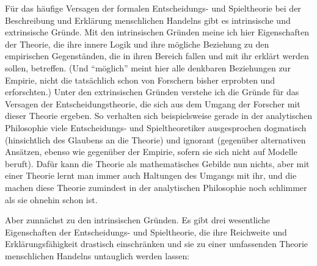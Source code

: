 Für das häufige Versagen der formalen Entscheidungs- und Spieltheorie bei der
Beschreibung und Erklärung menschlichen Handelns gibt es intrinsische und
extrinsische Gründe. Mit den intrinsischen Gründen meine ich hier Eigenschaften
der Theorie, die ihre innere Logik und ihre mögliche Beziehung zu den
empirischen Gegenständen, die in ihren Bereich fallen und mit ihr erklärt werden
sollen, betreffen. (Und ``möglich'' meint hier alle denkbaren Beziehungen zur
Empirie, nicht die tatsächlich schon von Forschern bisher erprobten und
erforschten.) Unter den extrinsischen Gründen verstehe ich die Gründe für das
Versagen der Entscheidungstheorie, die sich aus dem Umgang der Forscher mit
dieser Theorie ergeben. So verhalten sich beispielsweise gerade in der
analytischen Philosophie viele Entscheidungs- und Spieltheoretiker ausgesprochen
dogmatisch (hinsichtlich des Glaubens an die Theorie) und ignorant (gegenüber
alternativen Ansätzen, ebenso wie gegenüber der Empirie, sofern sie sich nicht
auf Modelle beruft). Dafür kann die Theorie als mathematisches Gebilde nun
nichts, aber mit einer Theorie lernt man immer auch Haltungen des Umgangs mit
ihr, und die machen diese Theorie zumindest in der analytischen Philosophie noch
schlimmer als sie ohnehin schon ist.

Aber zunnächst zu den intrinsischen Gründen. Es gibt drei wesentliche
Eigenschaften der Entscheidungs- und Spieltheorie, die ihre Reichweite
und Erklärungsfähigkeit drastisch einschränken und sie zu einer
umfassenden Theorie menschlichen Handelns untauglich werden lassen:

